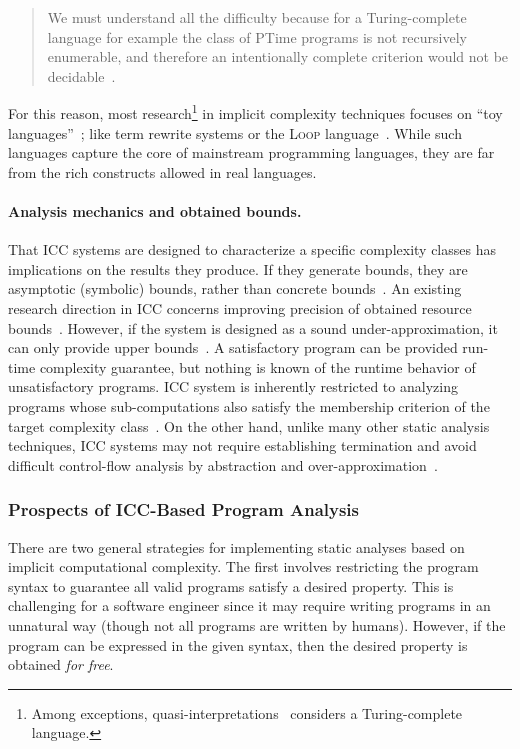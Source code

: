 \begin{quotation}
\noindent We must understand all the diﬃculty because for a Turing-complete language for example the class of PTime programs is not recursively enumerable, and therefore an intentionally complete criterion would not be decidable~\cite[Sect. 4.1]{mogbil2012}.
\end{quotation}

\noindent For this reason, most research\footnote{
Among exceptions, quasi-interpretations~\cite{marion2000} considers a Turing-complete language.}
in implicit complexity techniques focuses on \enquote{toy languages}~\cite{moyen2017,rubiano17};
like term rewrite systems or the \textsc{Loop} language~\cite{kristiansen2005}.
While such languages capture the core of mainstream programming languages, they are far from the rich constructs allowed in real languages.

\paragraph*{Analysis mechanics and obtained bounds.}
That ICC systems are designed to characterize a specific complexity classes has implications on the results they produce.
If they generate bounds, they are asymptotic (symbolic) bounds, rather than concrete bounds~\cite{baillot2019}.
An existing research direction in ICC concerns improving precision of obtained resource bounds~\cite{benamram2020}.
However, if the system is designed as a sound under-approximation, it can only provide upper bounds~\cite[p. 119]{moyen2017}.
A satisfactory program can be provided run-time complexity guarantee, but nothing is known of the runtime behavior of unsatisfactory programs.
ICC system is inherently restricted to analyzing programs whose sub-computations also satisfy the membership criterion of the target complexity class~\cite{baillot2019}.
On the other hand, unlike many other static analysis techniques,
ICC systems may not require establishing termination and avoid difficult control-flow analysis by abstraction and over-approximation~\cite{jones2009}.

\subsubsection{Prospects of ICC-Based Program Analysis}

There are two general strategies for implementing static analyses based on implicit computational complexity.
The first involves restricting the program syntax to guarantee all valid programs satisfy a desired property.
This is challenging for a software engineer since it may require writing programs in an unnatural way (though not all programs are written by humans).
However, if the program can be expressed in the given syntax, then the desired property is obtained \emph{for free}.


